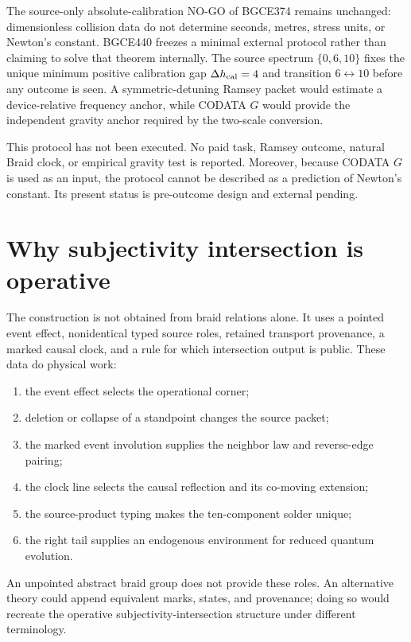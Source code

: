 \documentclass[11pt]{article}
\theoremstyle{definition}
\theoremstyle{remark}
\begin{document}
The source-only absolute-calibration NO-GO of BGCE374 remains unchanged: dimensionless collision data do not determine seconds, metres, stress units, or Newton's constant. BGCE440 freezes a minimal external protocol rather than claiming to solve that theorem internally. The source spectrum $\{0,6,10\}$ fixes the unique minimum positive calibration gap $\Delta h_{\rm cal}=4$ and transition $6\leftrightarrow10$ before any outcome is seen. A symmetric-detuning Ramsey packet would estimate a device-relative frequency anchor, while CODATA $G$ would provide the independent gravity anchor required by the two-scale conversion.

This protocol has not been executed. No paid task, Ramsey outcome, natural Braid clock, or empirical gravity test is reported. Moreover, because CODATA $G$ is used as an input, the protocol cannot be described as a prediction of Newton's constant. Its present status is pre-outcome design and external pending.

\section{Why subjectivity intersection is operative}

The construction is not obtained from braid relations alone. It uses a pointed event effect, nonidentical typed source roles, retained transport provenance, a marked causal clock, and a rule for which intersection output is public. These data do physical work:
\begin{enumerate}
\item the event effect selects the operational corner;
\item deletion or collapse of a standpoint changes the source packet;
\item the marked event involution supplies the neighbor law and reverse-edge pairing;
\item the clock line selects the causal reflection and its co-moving extension;
\item the source-product typing makes the ten-component solder unique;
\item the right tail supplies an endogenous environment for reduced quantum evolution.
\end{enumerate}
An unpointed abstract braid group does not provide these roles. An alternative theory could append equivalent marks, states, and provenance; doing so would recreate the operative subjectivity-intersection structure under different terminology.
\end{document}
